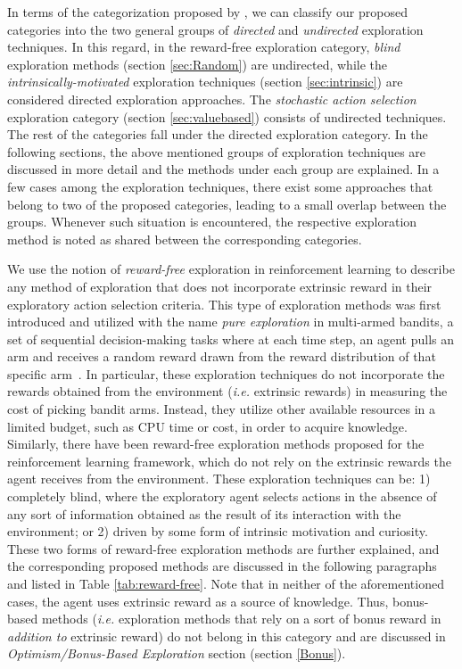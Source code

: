 In terms of the categorization proposed by , we can classify our proposed categories into the two general groups of \emph{directed} and \emph{undirected} exploration techniques. In this regard, in the reward-free exploration category, \emph{blind} exploration methods (section \ref{sec:Random}) are undirected, while the \emph{intrinsically-motivated} exploration techniques (section \ref{sec:intrinsic}) are considered directed exploration approaches. The \emph{stochastic action selection} exploration category (section \ref{sec:valuebased}) consists of undirected techniques. The rest of the categories fall under the directed exploration category. 
In the following sections, the above mentioned groups of exploration techniques are discussed in more detail and the methods under each group are explained. In a few cases among the exploration techniques, there exist some approaches that belong to two of the proposed categories, leading to a small overlap between the groups. Whenever such situation is encountered, the respective exploration method is noted as shared between the corresponding categories.

\label{sec:pure}
We use the notion of \emph{reward-free} exploration in reinforcement learning to describe any method of exploration that does not incorporate extrinsic reward in their exploratory action selection criteria. This type of exploration methods was first introduced and utilized with the name \emph{pure exploration} in multi-armed bandits, a set of sequential decision-making tasks where at each time step, an agent pulls an arm and receives a random reward drawn from the reward distribution of that specific arm~. In particular, these exploration techniques do not incorporate the rewards obtained from the environment (\emph{i.e.} extrinsic rewards) in measuring the cost of picking bandit arms. Instead, they utilize other available resources in a limited budget, such as CPU time or cost, in order to acquire knowledge. Similarly, there have been reward-free exploration methods proposed for the reinforcement learning framework, which do not rely on the extrinsic rewards the agent receives from the environment. These exploration techniques can be: 1) completely blind, where the exploratory agent selects actions in the absence of any sort of information obtained as the result of its interaction with the environment; or 2) driven by some form of intrinsic motivation and curiosity. These two forms of reward-free exploration methods are further explained, and the corresponding proposed methods are discussed in the following paragraphs and listed in Table \ref{tab:reward-free}. Note that in neither of the aforementioned cases, the agent uses extrinsic reward as a source of knowledge. Thus, bonus-based methods (\emph{i.e.} exploration methods that rely on a sort of bonus reward in \emph{addition to} extrinsic reward) do not belong in this category and are discussed in \emph{Optimism/Bonus-Based Exploration} section (section \ref{Bonus}).

